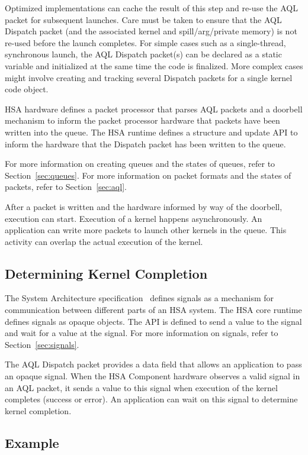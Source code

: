 \documentclass[final]{book}
\begin{document}
Optimized implementations can cache the result of this step and re-use the AQL
packet for subsequent launches. Care must be taken to ensure that the AQL
Dispatch packet (and the associated kernel and spill/arg/private memory) is not
re-used before the launch completes. For simple cases such as a
single-thread, synchronous launch, the AQL Dispatch packet(s) can be declared
as a static variable and initialized at the same time the code is
finalized. More complex cases might involve creating and tracking several
Dispatch packets for a single kernel code object.

HSA hardware defines a packet processor that parses AQL packets and a
doorbell mechanism to inform the packet processor hardware that packets have
been written into the queue. The HSA runtime defines a structure and update API
to inform the hardware that the Dispatch packet has been written to the queue.

For more information on creating queues and the states of queues, refer to
Section~\ref{sec:queues}. For more information on packet formats and the states
of packets, refer to Section~\ref{sec:aql}.

After a packet is written and the hardware informed by way of the doorbell,
execution can start. Execution of a kernel happens asynchronously. An application
can write more packets to launch other kernels in the queue. This activity can
overlap the actual execution of the kernel.

\subsection{Determining Kernel Completion}
The System Architecture specification~\cite{sar} defines signals as a mechanism
for communication between different parts of an HSA system. The HSA core runtime
defines signals as opaque objects. The API is defined to send a value to the
signal and wait for a value at the signal. For more information on signals,
refer to Section~\ref{sec:signals}.

The AQL Dispatch packet provides a data field that allows an application to pass
an opaque signal. When the HSA Component hardware observes a valid signal in
an AQL packet, it sends a value to this signal when execution of the kernel
completes (success or error). An application can wait on this signal to determine
kernel completion.

\subsection{Example}

\end{document}
